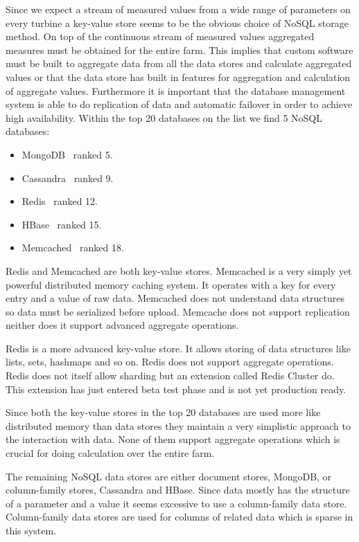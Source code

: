 Since we expect a stream of measured values from a wide range of parameters on every turbine a key-value store seems to be the obvious choice of NoSQL storage method. On top of the continuous stream of measured values aggregated measures must be obtained for the entire farm. This implies that custom software must be built to aggregate data from all the data stores and calculate aggregated values or that the data store has built in features for aggregation and calculation of aggregate values. Furthermore it is important that the database management system is able to do replication of data and automatic failover in order to achieve high availability.
Within the top 20 databases on the list we find 5 NoSQL databases:

\begin{itemize}
\item MongoDB~\cite{mongodb} ranked 5.
\item Cassandra~\cite{cassandra} ranked 9.
\item Redis~\cite{redis} ranked 12.
\item HBase~\cite{hbase} ranked 15.
\item Memcached~\cite{memcached} ranked 18.
\end{itemize}

Redis and Memcached are both key-value stores. Memcached is a very simply yet powerful distributed memory caching system.
It operates with a key for every entry and a value of raw data.
Memcached does not understand data structures so data must be serialized before upload.
Memcache does not support replication neither does it support advanced aggregate operations.

Redis is a more advanced key-value store.
It allows storing of data structures like lists, sets, hashmaps and so on.
Redis does not support aggregate operations.
Redis does not itself allow sharding but an extension called Redis Cluster do. This extension has just entered beta test phase and is not yet production ready.

Since both the key-value stores in the top 20 databases are used more like distributed memory than data stores they maintain a very simplistic approach to the interaction with data.
None of them support aggregate operations which is crucial for doing calculation over the entire farm.

The remaining NoSQL data stores are either document stores, MongoDB, or column-family stores, Cassandra and HBase.
Since data mostly has the structure of a parameter and a value it seems excessive to use a column-family data store. 
Column-family data stores are used for columns of related data which is sparse in this system.

